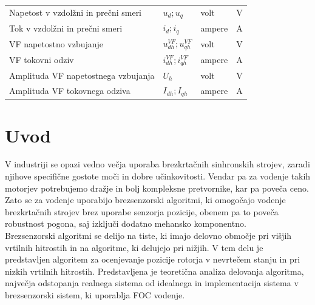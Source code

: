 \documentclass[a4paper,twoside,openright,12pt,slovene]{book}
\begin{document}
\begin{center}
\begin{tabular}{*{4}{l}}
        Napetost v vzdolžni in prečni smeri                        & $u_{d}; u_{q}$                         & volt                 & V                      \\
        Tok v vzdolžni in prečni smeri                             & $i_{d}; i_{q}$                         & ampere               & A                      \\
        VF napetostno vzbujanje                                    & $u^{VF}_{dh}; u^{VF}_{qh}$             & volt                 & V                      \\
        VF tokovni odziv                                           & $i^{VF}_{dh}; i^{VF}_{qh}$             & ampere               & A                      \\
        Amplituda VF napetostnega vzbujanja                        & $U_h$                                  & volt                 & V                      \\
        Amplituda VF tokovnega odziva                              & $I_{dh}; I_{qh}$                       & ampere               & A                      \\
    \end{tabular}
\end{center}

\mainmatter

%
%
%

\chapter{Uvod} \label{uvod}

V industriji se opazi vedno večja uporaba brezkrtačnih sinhronskih strojev, zaradi njihove specifične gostote moči in dobre učinkovitosti. Vendar pa za vodenje takih motorjev potrebujemo dražje in
bolj kompleksne pretvornike, kar pa poveča ceno. Zato se za vodenje uporabijo brezsenzorski algoritmi, ki omogočajo vodenje brezkrtačnih strojev brez uporabe senzorja pozicije, obenem pa to poveča
robustnost pogona, saj izključi dodatno mehansko komponentno. 
\\
Brezsenzorski algoritmi se delijo na tiste, ki imajo delovno območje pri višjih vrtilnih hitrostih in na algoritme, ki delujejo pri nižjih. V tem delu je predstavljen algoritem za ocenjevanje pozicije
rotorja v nevrtečem stanju in pri nizkih vrtilnih hitrostih. Predstavljena je teoretična analiza delovanja algoritma, največja odstopanja realnega sistema od idealnega in implementacija sistema
v brezsenzorski sistem, ki uporablja FOC vodenje.
\end{document}
